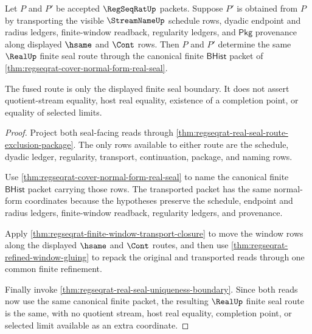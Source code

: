 \begin{theorem}
\label{thm:regseqrat-real-seal-transport-fusion}
Let $P$ and $P'$ be accepted $\RegSeqRatUp$ packets. Suppose $P'$ is obtained
from $P$ by transporting the visible $\StreamNameUp$ schedule rows, dyadic
endpoint and radius ledgers, finite-window readback, regularity ledgers, and
$\mathsf{Pkg}$ provenance along displayed $\hsame$ and $\Cont$ rows. Then $P$
and $P'$ determine the same $\RealUp$ finite seal route through the canonical
finite $\mathsf{BHist}$ packet of
\autoref{thm:regseqrat-cover-normal-form-real-seal}.

The fused route is only the displayed finite seal boundary. It does not assert
quotient-stream equality, host real equality, existence of a completion point,
or equality of selected limits.
\end{theorem}
\begin{proof}
Project both seal-facing reads through
\autoref{thm:regseqrat-real-seal-route-exclusion-package}. The only rows
available to either route are the schedule, dyadic ledger, regularity,
transport, continuation, package, and naming rows.

Use \autoref{thm:regseqrat-cover-normal-form-real-seal} to name the canonical
finite $\mathsf{BHist}$ packet carrying those rows. The transported packet has
the same normal-form coordinates because the hypotheses preserve the schedule,
endpoint and radius ledgers, finite-window readback, regularity ledgers, and
provenance.

Apply \autoref{thm:regseqrat-finite-window-transport-closure} to move the
window rows along the displayed $\hsame$ and $\Cont$ routes, and then use
\autoref{thm:regseqrat-refined-window-gluing} to repack the original and
transported reads through one common finite refinement.

Finally invoke \autoref{thm:regseqrat-real-seal-uniqueness-boundary}. Since
both reads now use the same canonical finite packet, the resulting $\RealUp$
finite seal route is the same, with no quotient stream, host real equality,
completion point, or selected limit available as an extra coordinate.
\end{proof}

